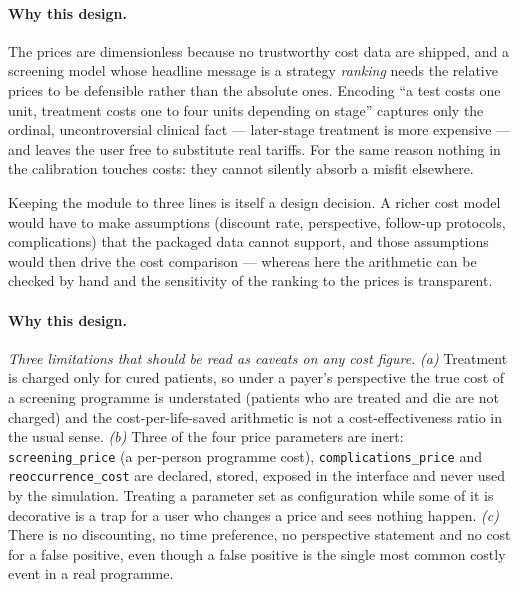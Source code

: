 \documentclass[12pt,a4paper]{article}
\newcommand{\id}[1]{\texttt{#1}}
\newcommand{\why}[1]{\paragraph{Why this design.} #1}
\begin{document}
\why{The prices are dimensionless because no trustworthy cost data are shipped, and a screening model whose
headline message is a strategy \emph{ranking} needs the relative prices to be defensible rather than the
absolute ones. Encoding ``a test costs one unit, treatment costs one to four units depending on stage''
captures only the ordinal, uncontroversial clinical fact --- later-stage treatment is more expensive --- and
leaves the user free to substitute real tariffs. For the same reason nothing in the calibration touches
costs: they cannot silently absorb a misfit elsewhere.

Keeping the module to three lines is itself a design decision. A richer cost model would have to make
assumptions (discount rate, perspective, follow-up protocols, complications) that the packaged data cannot
support, and those assumptions would then drive the cost comparison --- whereas here the arithmetic can be
checked by hand and the sensitivity of the ranking to the prices is transparent.}

\why{\emph{Three limitations that should be read as caveats on any cost figure.}
\emph{(a)} Treatment is charged only for cured patients, so under a payer's perspective the true cost of a
screening programme is understated (patients who are treated and die are not charged) and the
cost-per-life-saved arithmetic is not a cost-effectiveness ratio in the usual sense.
\emph{(b)} Three of the four price parameters are inert: \id{screening\_price} (a per-person programme
cost), \id{complications\_price} and \id{reoccurrence\_cost} are declared, stored, exposed in the interface
and never used by the simulation. Treating a parameter set as configuration while some of it is decorative
is a trap for a user who changes a price and sees nothing happen.
\emph{(c)} There is no discounting, no time preference, no perspective statement and no cost for a false
positive, even though a false positive is the single most common costly event in a real programme.}
\end{document}
